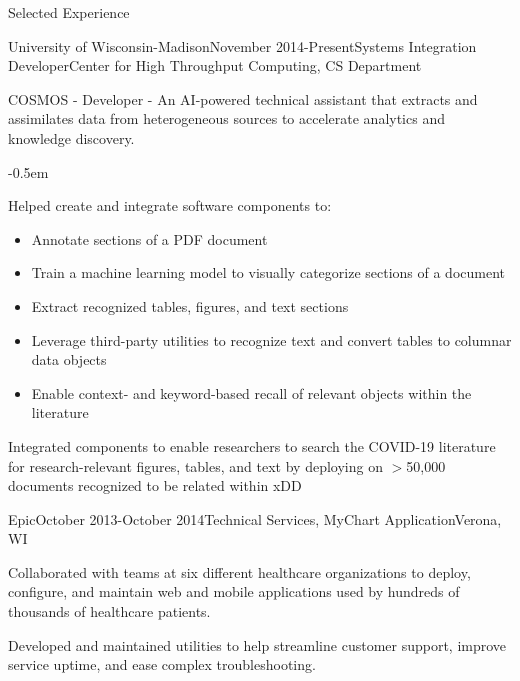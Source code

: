 \documentclass{resume} %
\begin{document}
\begin{rSection}{Selected Experience}
\begin{rSubsection}{University of Wisconsin-Madison}{November
    2014-Present}{Systems Integration Developer}{Center for High Throughput
    Computing, CS Department}
\begin{list}{}{\leftmargin=1.5em}
    \end{list}
\item COSMOS - Developer - An AI-powered technical assistant that extracts and assimilates data from heterogeneous sources to accelerate analytics and knowledge discovery. 
    \begin{list}{}{\leftmargin=1.5em} 
      \itemsep -0.5em \vspace{-0.5em} %
      \item Helped create and integrate software components to:
        \renewcommand\labelitemi{$\cdot$}
          \begin{itemize}{}{\leftmargin=1.25em}
          \item Annotate sections of a PDF document
          \item Train a machine learning model to visually categorize sections
              of a document
          \item Extract recognized tables, figures, and text sections
          \item Leverage third-party utilities to recognize text and convert tables
              to columnar data objects
          \item Enable context- and keyword-based recall of relevant objects
          within the literature
          \end{itemize}
      \item Integrated components to enable researchers to search the COVID-19 literature for
          research-relevant figures, tables, and text by deploying on
          $>$50,000 documents recognized to be related within xDD
    \end{list}
\end{rSubsection}

\begin{rSubsection}{Epic}{October 2013-October 2014}{Technical Services, MyChart
Application}{Verona, WI}
\item Collaborated with teams at six different healthcare organizations to
deploy, configure, and maintain web and mobile applications used by
hundreds of thousands of healthcare patients.
\item Developed and maintained utilities to help streamline customer support,
improve service uptime, and ease complex troubleshooting.
\end{rSubsection}


\end{rSection}
\end{document}
